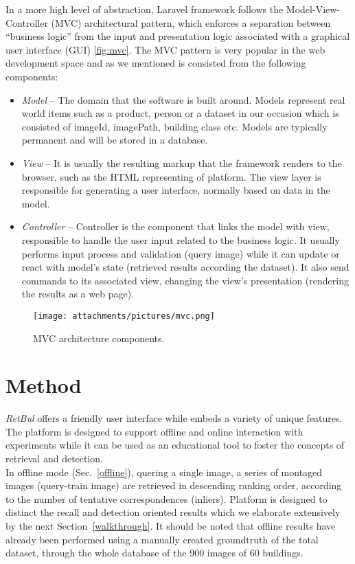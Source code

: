 In a more high level of abstraction, Laravel framework follows the Model-View-Controller (MVC) architectural pattern, which enforces a separation between ``business logic'' from the input and presentation logic associated with a graphical user interface (GUI) \ref{fig:mvc}. The MVC pattern is very popular in the web development space and as we mentioned is consisted from the following components:
\begin{itemize}
    \item \textit{Model} -- The domain that the software is built around. Models represent real world items such as a
    product, person or a dataset in our occasion which is consisted of imageId, imagePath, building class etc. Models are typically permanent and will be stored in a database.
    \item \textit{View} -- It is usually the resulting markup that the framework renders to the browser, such as the HTML representing of platform. The view layer is responsible for generating a user interface, normally based on data in the model.
    \item \textit{Controller} -- Controller is the component that links the model with view, responsible to handle the user input related to the business logic. It usually performs input process and validation (query image) while it can update or react with model's state (retrieved results according the dataset). It also send commands to its associated view, changing the view's presentation (rendering the results as a web page).
\end{itemize}
 
\begin{figure}[h!]
  \centering
  \texttt{[image: attachments/pictures/mvc.png]}
  \caption{MVC architecture components.}
  \end{figure} 
\label{fig:mvc}


\section{Method}\label{retbulmethod}

\textit{RetBul} offers a friendly user interface while embeds a variety of unique features. The platform is designed to support offline and online interaction with experiments while it can be used as an educational tool to foster the concepts of retrieval and detection.\\

In offline mode (Sec.~\ref{offline}), quering a single image, a series of montaged images (query-train image) are retrieved in descending ranking order, according to the number of tentative correspondences (inliers). Platform is designed to distinct the recall and detection oriented results which we elaborate extensively by the next Section~\ref{walkthrough}.
It should be noted that offline results have already been performed using a manually created groundtruth of the total dataset, through the whole database of the 900 images of 60 buildings.
 
